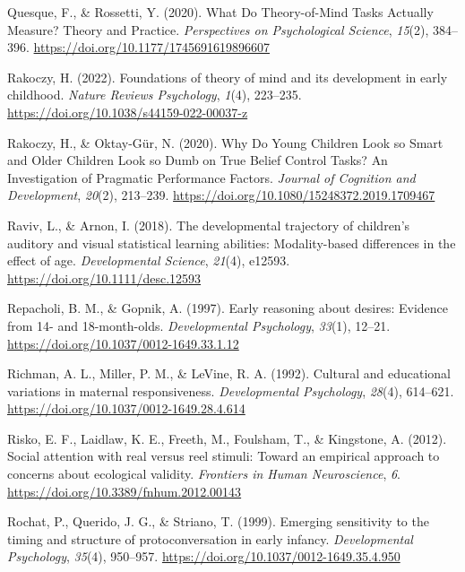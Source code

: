 \documentclass[
]{scrbook}
\newlength{\cslhangindent}
\newenvironment{CSLReferences}[2] %
 {\begin{list}{}{%
  \setlength{\itemindent}{0pt}
  \setlength{\leftmargin}{0pt}
  \setlength{\parsep}{0pt}
  \ifodd #1
   \setlength{\leftmargin}{\cslhangindent}
   \setlength{\itemindent}{-1\cslhangindent}
  \fi
  \setlength{\itemsep}{#2\baselineskip}}}
 {\end{list}}
\begin{document}
\begin{CSLReferences}{1}{0}
Quesque, F., \& Rossetti, Y. (2020). What {Do Theory-of-Mind Tasks Actually Measure}? {Theory} and {Practice}. \emph{Perspectives on Psychological Science}, \emph{15}(2), 384--396. \url{https://doi.org/10.1177/1745691619896607}

Rakoczy, H. (2022). Foundations of theory of mind and its development in early childhood. \emph{Nature Reviews Psychology}, \emph{1}(4), 223--235. \url{https://doi.org/10.1038/s44159-022-00037-z}

Rakoczy, H., \& Oktay-Gür, N. (2020). Why {Do Young Children Look} so {Smart} and {Older Children Look} so {Dumb} on {True Belief Control Tasks}? {An Investigation} of {Pragmatic Performance Factors}. \emph{Journal of Cognition and Development}, \emph{20}(2), 213--239. \url{https://doi.org/10.1080/15248372.2019.1709467}

Raviv, L., \& Arnon, I. (2018). The developmental trajectory of children's auditory and visual statistical learning abilities: Modality-based differences in the effect of age. \emph{Developmental Science}, \emph{21}(4), e12593. \url{https://doi.org/10.1111/desc.12593}

Repacholi, B. M., \& Gopnik, A. (1997). Early reasoning about desires: {Evidence} from 14- and 18-month-olds. \emph{Developmental Psychology}, \emph{33}(1), 12--21. \url{https://doi.org/10.1037/0012-1649.33.1.12}

Richman, A. L., Miller, P. M., \& LeVine, R. A. (1992). Cultural and educational variations in maternal responsiveness. \emph{Developmental Psychology}, \emph{28}(4), 614--621. \url{https://doi.org/10.1037/0012-1649.28.4.614}

Risko, E. F., Laidlaw, K. E., Freeth, M., Foulsham, T., \& Kingstone, A. (2012). Social attention with real versus reel stimuli: Toward an empirical approach to concerns about ecological validity. \emph{Frontiers in Human Neuroscience}, \emph{6}. \url{https://doi.org/10.3389/fnhum.2012.00143}

Rochat, P., Querido, J. G., \& Striano, T. (1999). Emerging sensitivity to the timing and structure of protoconversation in early infancy. \emph{Developmental Psychology}, \emph{35}(4), 950--957. \url{https://doi.org/10.1037/0012-1649.35.4.950}


\end{CSLReferences}
\end{document}
